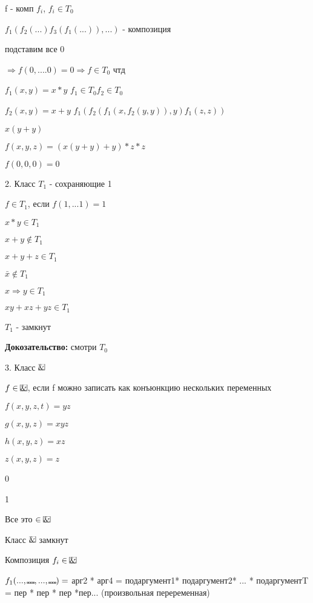\documentclass[russian]{lecture-notes}
\begin{document}
	f - комп $f_{i}$, $f_{i} \in T_{0}$

	$f_{1}(f_{2}(...)f_{3}(f_{1}(...)),...)$ - композиция

	подставим все 0

	$\Rightarrow f(0,....0) = 0 \Rightarrow f \in T_{0} $ чтд

	\begin{example}
		$f_{1}(x,y) = x*y$ \qquad $f_{1} \in T_{0} f_{2} \in T_{0}$

		$f_{2}(x,y) = x+y$ \qquad $f_{1}(f_{2}(f_{1}(x,f_{2}(y,y)),y)f_{1}(z,z))$

		$x(y+y)$

		$f(x,y,z) = (x(y+y)+y)*z*z$

		$f(0,0,0) = 0$

		2. Класс $T_{1}$ - сохраняющие 1

		$f \in T_{1}$, если $f(1,...1) = 1$

		$x*y \in T_{1}$

		$x+y \notin T_{1}$

		$x+y+z \in T_{1}$

		$\bar{x} \notin T_{1}$

		$x \Rightarrow y \in T_{1}$

		$xy + xz + yz \in T_{1}$

		\begin{proposition}
			$T_{1}$ - замкнут
			\end {proposition}


		\textbf{Докозательство:} смотри $T_{0}$

		3. Класс $\frame{\&}$

		$f \in \frame{\&}$, если f можно записать как конъюнкцию нескольких переменных

		$f(x,y,z,t) = yz$

		$g(x,y,z) = xyz$

		$h(x,y,z) = xz$

		$z(x,y,z) = z$

		0

		1

		Все это $\in \frame{\&}$

		\begin{proposition}
			Класс $\frame{\&}$ замкнут
			\end{proposition}

		Композиция $f_{i} \in \frame{\&}$

		$f_1(...,\frame{...},...,\frame{...}) = $ арг2 * арг4 = подаргумент1* подаргумент2* ... * подаргументT =
		пер * пер * пер *пер... (произвольная переременная)


\end{example}
\end{document}
